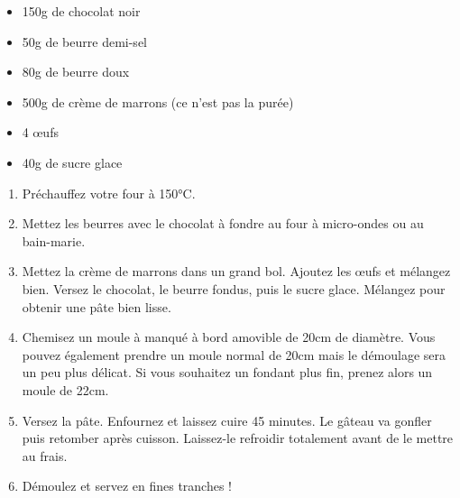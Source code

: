 \bigskip
{}
{}{\begin{itemize}
	\item 150g de chocolat noir
	\item 50g de beurre demi-sel
	\item 80g de beurre doux
	\item 500g de crème de marrons (ce n'est pas la purée)
	\item 4 œufs
	\item 40g de sucre glace
\end{itemize}}
{\begin{enumerate}
	\item Préchauffez votre four à 150°C.
	\item Mettez les beurres avec le chocolat à fondre au four à micro-ondes ou au bain-marie.
	\item Mettez la crème de marrons dans un grand bol. Ajoutez les œufs et mélangez bien. Versez le chocolat, le beurre fondus, puis le sucre glace. Mélangez pour obtenir une pâte bien lisse. 
	\item Chemisez un moule à manqué à bord amovible de 20cm de diamètre. Vous pouvez également prendre un moule normal de 20cm mais le démoulage sera un peu plus délicat. Si vous souhaitez un fondant plus fin, prenez alors un moule de 22cm.
	\item Versez la pâte. Enfournez et laissez cuire 45 minutes. Le gâteau va gonfler puis retomber après cuisson. Laissez-le refroidir totalement avant de le mettre au frais. 
	\item Démoulez et servez en fines tranches ! 
\end{enumerate}}

